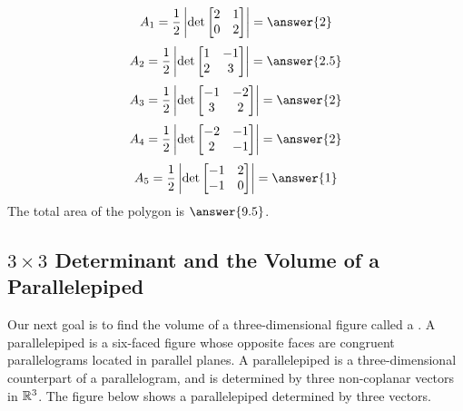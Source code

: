 \documentclass{ximera}
\begin{document}
\begin{example}
\begin{explanation}
$$A_1=\frac{1}{2}\left|\det\begin{bmatrix}2 & 1\\0 & 2\end{bmatrix}\right |=\answer{2}$$
$$A_2=\frac{1}{2}\left|\det\begin{bmatrix}1 & -1\\2 & 3\end{bmatrix}\right |=\answer{2.5}$$
$$A_3=\frac{1}{2}\left|\det\begin{bmatrix}-1 & -2\\3 & 2\end{bmatrix}\right |=\answer{2}$$
$$A_4=\frac{1}{2}\left|\det\begin{bmatrix}-2 & -1\\2 & -1\end{bmatrix}\right |=\answer{2}$$
$$A_5=\frac{1}{2}\left|\det\begin{bmatrix}-1 & 2\\-1 & 0\end{bmatrix}\right |=\answer{1}$$
The total area of the polygon is $\answer{9.5}$.
\end{explanation}
\end{example}


\subsection*{$3\times 3$ Determinant and the Volume of a Parallelepiped}

Our next goal is to find the volume of a three-dimensional figure called a .  A parallelepiped is a six-faced figure whose opposite faces are congruent parallelograms located in parallel planes.  A parallelepiped is a three-dimensional counterpart of a parallelogram, and is determined by three non-coplanar vectors in $\mathbb{R}^3$.  The figure below shows a parallelepiped determined by three vectors.

\begin{center}
\end{center}
\end{document}
